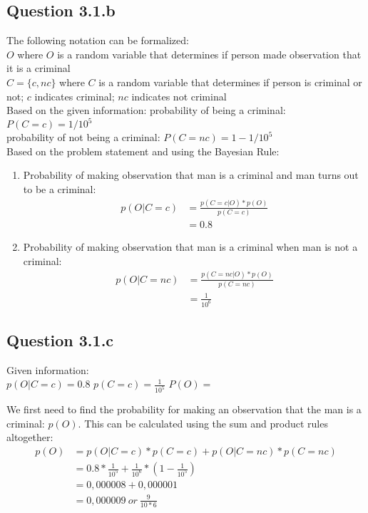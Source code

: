 \documentclass[a4paper]{article}
\begin{document}
\subsection*{Question 3.1.b}
The following notation can be formalized: \\
$O$ where $O$ is a random variable that determines if person made observation that it is a criminal \\
$C = \{c, nc\}$ where $C$ is a random variable that determines if person is criminal or not; $c$ indicates criminal; $nc$ indicates not criminal \\

Based on the given information: \newline
probability of being a criminal: $P(C=c) = 1/10^5$ \\
probability of not being a criminal: $P(C=nc) = 1 - 1/10^5$ \\


Based on the problem statement and using the Bayesian Rule: \\
\begin{enumerate}
    \item Probability of making observation that man is a criminal and man turns out to be a criminal: 
    \begin{align*}
        p(O | C=c) &= \frac{p(C=c | O) * p(O)} {p(C=c)}  \\
                   &= 0.8
    \end{align*}{}
    \item Probability of making observation that man is a criminal when man is not a criminal:
    \begin{align*}
        p(O | C=nc) &= \frac{p(C=nc | O) * p(O)} {p(C=nc)} \\
                    &= \frac{1}{10^6}
    \end{align*}{} 
\end{enumerate}


\subsection*{Question 3.1.c}
Given information: \\
$ p(O | C=c) = 0.8$
$ p(C=c) = \frac{1}{10^5}$
$ P(O) = $

We first need to find the probability for making an observation that the man is a criminal: $p(O)$. This can be calculated using the sum and product rules altogether:
\begin{align*}
    p(O) &= p(O | C=c) * p(C=c) + p(O | C=nc) * p(C=nc) \\
         &= 0.8 * \frac{1}{10^5} + \frac{1}{10^6} * (1 - \frac{1}{10^5}) \\
         &= 0,000008 + 0,000001 \\
         &= 0,000009\ or\ \frac{9}{10*6}
\end{align*}{}
\end{document}
